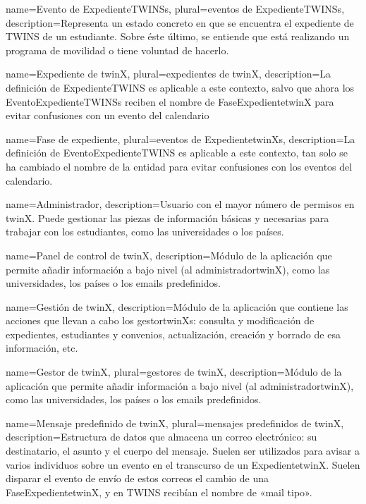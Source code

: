 {
	name=Evento de \glspl{ExpedienteTWINS},
	plural=eventos de \glspl{ExpedienteTWINS},
	description={Representa un estado concreto en que se encuentra el expediente de TWINS de un estudiante. Sobre éste último, se entiende que está realizando un programa de movilidad o tiene voluntad de hacerlo.}
}

{
	name=Expediente de twinX,
	plural=expedientes de twinX,
	description={La definición de \gls{ExpedienteTWINS} es aplicable a este contexto, salvo que ahora los \glspl{EventoExpedienteTWINS} reciben el nombre de \gls{FaseExpedientetwinX} para evitar confusiones con un evento del calendario}
}

{
	name=Fase de expediente,
	plural=eventos de \glspl{ExpedientetwinX},
	description={La definición de \gls{EventoExpedienteTWINS} es aplicable a este contexto, tan solo se ha cambiado el nombre de la entidad para evitar confusiones con los eventos del calendario.}
}

{
name=Administrador,
description={Usuario con el mayor número de permisos en twinX. Puede gestionar las piezas de información básicas y necesarias para trabajar con los estudiantes, como las universidades o los países.}
}

{
	name=Panel de control de twinX,
	description={Módulo de la aplicación que permite añadir información a bajo nivel (al \gls{administradortwinX}), como las universidades, los países o los emails predefinidos.}
}

{
	name=Gestión de twinX,
	description={Módulo de la aplicación que contiene las acciones que llevan a cabo los \glspl{gestortwinX}: consulta y modificación de expedientes, estudiantes y convenios, actualización, creación y borrado de esa información, etc.}
}

{
	name=Gestor de twinX,
	plural=gestores de twinX,
	description={Módulo de la aplicación que permite añadir información a bajo nivel (al \gls{administradortwinX}), como las universidades, los países o los emails predefinidos.}
}

{
	name=Mensaje predefinido de twinX,
	plural=mensajes predefinidos de twinX,
	description={Estructura de datos que almacena un correo electrónico: su destinatario, el asunto y el cuerpo del mensaje. Suelen ser utilizados para avisar a varios individuos sobre un evento en el transcurso de un \gls{ExpedientetwinX}. Suelen disparar el evento de envío de estos correos el cambio de una \gls{FaseExpedientetwinX}, y en TWINS recibían el nombre de «mail tipo».}
}

\glsaddall